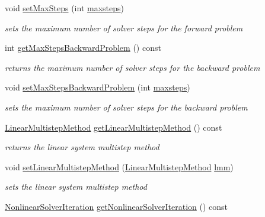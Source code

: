 \begin{DoxyCompactItemize}
void \mbox{\hyperlink{classamici_1_1_solver_ab321627a9f9d22013638e0eb9b14d2dc}{set\+Max\+Steps}} (int \mbox{\hyperlink{classamici_1_1_solver_a029415ebe024ac6281fd9f190aefb2ee}{maxsteps}})
\begin{DoxyCompactList}\small\item\em sets the maximum number of solver steps for the forward problem \end{DoxyCompactList}\item 
int \mbox{\hyperlink{classamici_1_1_solver_a8f683e8adf7b34cab6dff296b1d38c83}{get\+Max\+Steps\+Backward\+Problem}} () const
\begin{DoxyCompactList}\small\item\em returns the maximum number of solver steps for the backward problem \end{DoxyCompactList}\item 
void \mbox{\hyperlink{classamici_1_1_solver_aa1d39cd744f489c17c3497c98acb7f59}{set\+Max\+Steps\+Backward\+Problem}} (int \mbox{\hyperlink{classamici_1_1_solver_a029415ebe024ac6281fd9f190aefb2ee}{maxsteps}})
\begin{DoxyCompactList}\small\item\em sets the maximum number of solver steps for the backward problem \end{DoxyCompactList}\item 
\mbox{\hyperlink{namespaceamici_a9ebe272482a8e073efe7078b7e96e8bc}{Linear\+Multistep\+Method}} \mbox{\hyperlink{classamici_1_1_solver_a60631d9a18e29c1102cae7cb77b9918c}{get\+Linear\+Multistep\+Method}} () const
\begin{DoxyCompactList}\small\item\em returns the linear system multistep method \end{DoxyCompactList}\item 
void \mbox{\hyperlink{classamici_1_1_solver_a2143a6f85b81c24611aad5689865953c}{set\+Linear\+Multistep\+Method}} (\mbox{\hyperlink{namespaceamici_a9ebe272482a8e073efe7078b7e96e8bc}{Linear\+Multistep\+Method}} \mbox{\hyperlink{classamici_1_1_solver_af71d1353291520f9ba68df79c4b9f053}{lmm}})
\begin{DoxyCompactList}\small\item\em sets the linear system multistep method \end{DoxyCompactList}\item 
\mbox{\hyperlink{namespaceamici_a13388d34e4c35bb592c3e821c35cc923}{Nonlinear\+Solver\+Iteration}} \mbox{\hyperlink{classamici_1_1_solver_a33883905a8ab056896373d76f18ce683}{get\+Nonlinear\+Solver\+Iteration}} () const

\end{DoxyCompactItemize}

